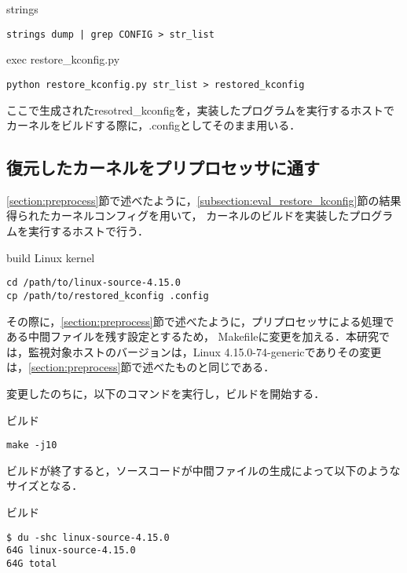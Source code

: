 \begin{itembox}[l]{strings}
    \begin{verbatim}
strings dump | grep CONFIG > str_list
    \end{verbatim}
\end{itembox}

\begin{itembox}[l]{exec restore_kconfig.py}
    \begin{verbatim}
python restore_kconfig.py str_list > restored_kconfig
    \end{verbatim}
\end{itembox}

ここで生成されたresotred_kconfigを，実装したプログラムを実行するホストでカーネルをビルドする際に，.configとしてそのまま用いる．

\subsection{復元したカーネルをプリプロセッサに通す}

\ref{section:preprocess}節で述べたように，\ref{subsection:eval_restore_kconfig}節の結果得られたカーネルコンフィグを用いて，
カーネルのビルドを実装したプログラムを実行するホストで行う．

\begin{itembox}[l]{build Linux kernel}
    \begin{verbatim}
cd /path/to/linux-source-4.15.0
cp /path/to/restored_kconfig .config
    \end{verbatim}
\end{itembox}

その際に，\ref{section:preprocess}節で述べたように，プリプロセッサによる処理である中間ファイルを残す設定とするため，
Makefileに変更を加える．本研究では，監視対象ホストのバージョンは，Linux 4.15.0-74-genericでありその変更は，\ref{section:preprocess}節で述べたものと同じである．

変更したのちに，以下のコマンドを実行し，ビルドを開始する．

\begin{itembox}[l]{ビルド}
    \begin{verbatim}
make -j10
    \end{verbatim}
\end{itembox}

ビルドが終了すると，ソースコードが中間ファイルの生成によって以下のようなサイズとなる．

\begin{itembox}[l]{ビルド}
    \begin{verbatim}
$ du -shc linux-source-4.15.0
64G	linux-source-4.15.0
64G	total
    \end{verbatim}
\end{itembox}

